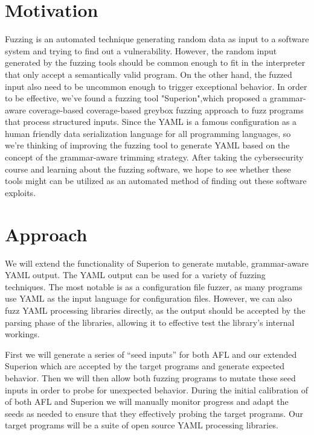 \documentclass[12pt]{diazessay}
\begin{document}

\section*{Motivation}

Fuzzing is an automated technique generating random data as input to a software system and trying to find out a vulnerability.
However, the random input generated by the fuzzing tools should be common enough to fit in the interpreter that only accept a semantically valid program. On the other hand, the fuzzed input also need to be uncommon enough to trigger exceptional behavior.
In order to be effective, we've found a fuzzing tool "Superion"\cite{superion},which proposed a grammar-aware coverage-based coverage-based greybox fuzzing approach to fuzz programs that process structured inputs.
Since the YAML is a famous configuration as a human friendly data serialization language for all programming languages, so we're thinking of improving the fuzzing tool to generate YAML based on the concept of the grammar-aware trimming strategy.
After taking the cybersecurity course and learning about the fuzzing software, we hope to see whether these tools might can be utilized as an automated method of finding out these software exploits.


\section*{Approach}

We will extend the functionality of Superion to generate mutable, grammar-aware YAML output.
The YAML output can be used for a variety of fuzzing techniques.
The most notable is as a configuration file fuzzer, as many programs use YAML as the input language for configuration files.
However, we can also fuzz YAML processing libraries directly, as the output should be accepted by the parsing phase of the libraries, allowing it to effective test the library's internal workings.

First we will generate a series of ``seed inputs'' for both AFL and our extended Superion which are accepted by the target programs and generate expected behavior.
Then we will then allow both fuzzing programs to mutate these seed inputs \cite{Seed} in order to probe for unexpected behavior.
During the initial calibration of of both AFL and Superion we will manually monitor progress and adapt the seeds as needed to ensure that they effectively probing the target programs.
Our target programs will be a suite of open source YAML processing libraries.
\end{document}
